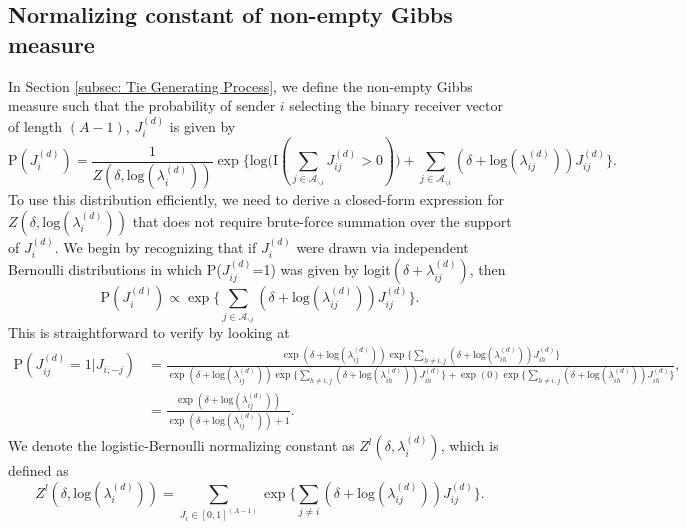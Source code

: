 \documentclass[a4paper]{article}
\begin{document}
  	 \subsection{Normalizing constant of non-empty Gibbs measure}\label{subsec: non-empty Gibbs measure}
  	 In Section \ref{subsec: Tie Generating Process}, we define the non-empty Gibbs measure such that 
 the probability of sender $i$ selecting the binary receiver vector of length $(A-1)$, $J_i^{(d)}$ is given by
  	 \begin{equation*} \text{P}(J_i^{(d)}) = \frac{1}{Z(\delta,\mbox{log}(\lambda_i^{(d)}))} \exp\Big\{ \mbox{log}\big(\text{I}( \sum_{j \in \mathcal{A}_{\backslash i}} J^{(d)}_{ij} > 0 )\big) + \sum_{j \in \mathcal{A}_{\backslash i}} (\delta+\mbox{log}(\lambda_{ij}^{(d)}))J_{ij}^{(d)} \Big\}.
  	 \end{equation*}
  	 	 To use this distribution efficiently, we need to derive a closed-form expression for $Z(\delta,\mbox{log}(\lambda_{i}^{(d)}))$ that does not require brute-force summation over the support of $J_i^{(d)}$. We begin by recognizing that if $J_i^{(d)}$ were drawn via independent Bernoulli distributions in which P($J_{ij}^{(d)}$=1) was given by logit$\left(\delta+\lambda_{ij}^{(d)}\right)$, then \begin{equation*}\text{P}(J_i^{(d)}) \propto \exp\Big\{  \sum_{j \in \mathcal{A}_{\backslash i}} (\delta+\mbox{log}(\lambda_{ij}^{(d)}))J_{ij}^{(d)}\Big\}.  	 \end{equation*}
  	 	  This is straightforward to verify by looking at 
  	 	  \begin{equation*}
  	 	  \begin{aligned}\text{P}(J_{ij}^{(d)}=1|J_{i,-j})&=\frac{ \exp{(\delta+\mbox{log}(\lambda_{ij}^{(d)}))}\exp\Big\{ \sum_{h\neq i,j} (\delta+\mbox{log}(\lambda_{ih}^{(d)}))J_{ih}^{(d)} \Big\}}{\exp{(\delta+\mbox{log}(\lambda_{ij}^{(d)}))}\exp\Big\{   \sum_{h\neq i,j} (\delta+\mbox{log}(\lambda_{ih}^{(d)}))J_{ih}^{(d)} \Big\}+ \exp{(0)}\exp\Big\{ \sum_{h\neq i,j} (\delta+\mbox{log}(\lambda_{ih}^{(d)}))J_{ih}^{(d)} \Big\}},\\
  	 	  &=\frac{ \exp{(\delta+\mbox{log}(\lambda_{ij}^{(d)}))}}{\exp{(\delta+\mbox{log}(\lambda_{ij}^{(d)}))} + 1}.\end{aligned}\end{equation*}
  	 	  We denote the logistic-Bernoulli normalizing constant as $Z^{l}(\delta,\lambda_i^{(d)})$, which is defined as 
  	 	  \begin{equation*}
  	 	  Z^{l}(\delta,\mbox{log}(\lambda_{i}^{(d)}))=\sum_{J_i \in [0,1]^{(A-1)}} \exp\Big\{\sum_{j\neq i} (\delta+\mbox{log}(\lambda_{ij}^{(d)}))J_{ij}^{(d)} \Big\}.
  	 	  \end{equation*}
  	 
\end{document}
